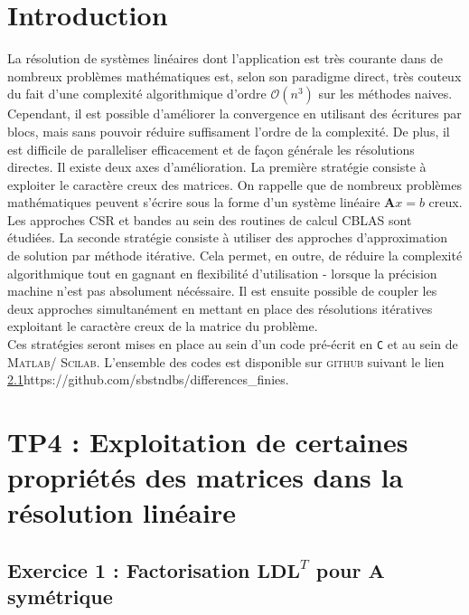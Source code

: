 \documentclass[12pt]{report}
\newcommand{\A}{\mathbf{A}}
\begin{document}
\newpage
\tableofcontents

\newpage



\section{Introduction}

La résolution de systèmes linéaires dont l'application est très courante dans de nombreux problèmes mathématiques est, selon son paradigme direct, très couteux du fait d'une complexité algorithmique d'ordre $\mathcal{O}(n^3)$ sur les méthodes naives. Cependant, il est possible d'améliorer la convergence en utilisant des écritures par blocs, mais sans pouvoir réduire suffisament l'ordre de la complexité. De plus, il est difficile de paralleliser efficacement et de façon générale les résolutions directes. Il existe deux axes d'amélioration. La première stratégie consiste à exploiter le caractère creux des matrices. On rappelle que de nombreux problèmes mathématiques peuvent s'écrire sous la forme d'un système linéaire $\A x = b$ creux. Les approches CSR et bandes au sein des routines de calcul CBLAS sont étudiées. La seconde stratégie consiste à utiliser des approches d'approximation de solution par méthode itérative. Cela permet, en outre, de réduire la complexité algorithmique tout en gagnant en flexibilité d'utilisation - lorsque la précision machine n'est pas absolument nécéssaire. Il est ensuite possible de coupler les deux approches simultanément en mettant en place des résolutions itératives exploitant le caractère creux de la matrice du problème. \\
Ces stratégies seront mises en place au sein d'un code pré-écrit en \texttt{C} et au sein de \textsc{Matlab}/ \textsc{Scilab}.
\newpage 
L'ensemble des codes est disponible sur \textsc{github} suivant le lien\\
 \ref{}{https://github.com/sbstndbs/differences\_finies}.
\newpage

\section{TP4 : Exploitation de certaines propriétés des matrices dans la résolution linéaire}
\subsection{Exercice 1 : Factorisation $\mathbf{LD}\mathbf{L}^T$ pour $\mathbf{A}$ symétrique}
\end{document}
